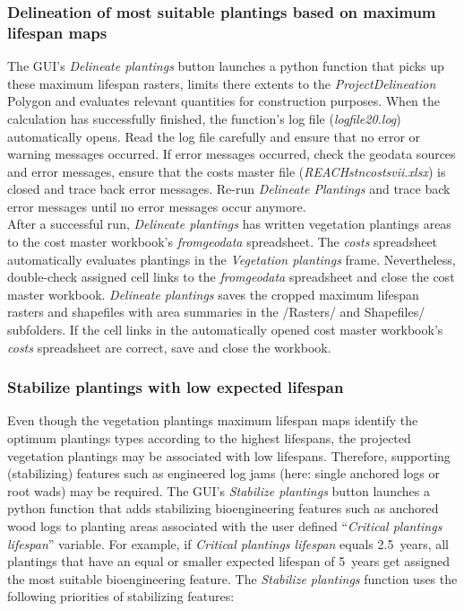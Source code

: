 \subsubsection{Delineation of most suitable plantings based on maximum lifespan maps} \label{sec:pmactm}

The GUI's \emph{Delineate plantings} button launches a python function that picks up these maximum lifespan rasters, limits there extents to the \emph{ProjectDelineation} Polygon and evaluates relevant quantities for construction purposes. When the calculation has successfully finished, the function's log file (\emph{logfile{\myUnderscore}20.log}) automatically opens. Read the log file carefully and ensure that no error or warning messages occurred. If error messages occurred, check the geodata sources and error messages, ensure that the costs master file (\emph{REACH{\myUnderscore}stn{\myUnderscore}costs{\myUnderscore}vii.xlsx}) is closed and trace back error messages. Re-run \emph{Delineate Plantings} and trace back error messages until no error messages occur anymore.\\

After a successful run, \emph{Delineate plantings} has written vegetation plantings areas to the cost master workbook's \emph{from{\myUnderscore}geodata} spreadsheet. The \emph{costs} spreadsheet automatically evaluates plantings in the \emph{Vegetation plantings}
frame. Nevertheless, double-check assigned cell links to the \emph{from{\myUnderscore}geodata} spreadsheet and close the cost master workbook. \emph{Delineate plantings} saves the cropped maximum lifespan rasters and shapefiles with area summaries in the /Rasters/ and Shapefiles/ subfolders. If the cell links in the automatically opened cost master workbook's \emph{costs} spreadsheet are correct, save and close the workbook.

\subsubsection{Stabilize plantings with low expected lifespan}

Even though the vegetation plantings maximum lifespan maps identify the optimum plantings types according to the highest lifespans, the projected vegetation plantings may be associated with low lifespans. Therefore, supporting (stabilizing) features such as engineered log jams (here: single anchored logs or root wads) may be required. The GUI's \emph{Stabilize plantings} button launches a python function that adds stabilizing bioengineering features such as anchored wood logs to planting areas associated with the user defined ``\emph{Critical plantings lifespan}'' variable. For example, if \emph{Critical plantings lifespan} equals 2.5~years, all plantings that have an equal or smaller expected lifespan of 5~years get assigned the most suitable bioengineering feature. The \emph{Stabilize plantings} function uses the following priorities of stabilizing features:

